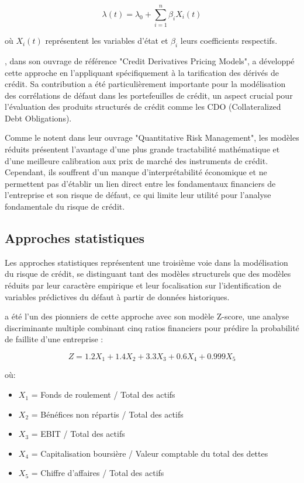 \begin{equation}
\lambda(t) = \lambda_0 + \sum_{i=1}^n \beta_i X_i(t)
\end{equation}

où $X_i(t)$ représentent les variables d'état et $\beta_i$ leurs coefficients respectifs.

\citet{schonbucher2003}, dans son ouvrage de référence "Credit Derivatives Pricing Models", a développé cette approche en l'appliquant spécifiquement à la tarification des dérivés de crédit. Sa contribution a été particulièrement importante pour la modélisation des corrélations de défaut dans les portefeuilles de crédit, un aspect crucial pour l'évaluation des produits structurés de crédit comme les CDO (Collateralized Debt Obligations).

Comme le notent \citet{mcneil2015} dans leur ouvrage "Quantitative Risk Management", les modèles réduits présentent l'avantage d'une plus grande tractabilité mathématique et d'une meilleure calibration aux prix de marché des instruments de crédit. Cependant, ils souffrent d'un manque d'interprétabilité économique et ne permettent pas d'établir un lien direct entre les fondamentaux financiers de l'entreprise et son risque de défaut, ce qui limite leur utilité pour l'analyse fondamentale du risque de crédit.

\subsection{Approches statistiques}

Les approches statistiques représentent une troisième voie dans la modélisation du risque de crédit, se distinguant tant des modèles structurels que des modèles réduits par leur caractère empirique et leur focalisation sur l'identification de variables prédictives du défaut à partir de données historiques.

\citet{altman1968} a été l'un des pionniers de cette approche avec son modèle Z-score, une analyse discriminante multiple combinant cinq ratios financiers pour prédire la probabilité de faillite d'une entreprise :

\begin{equation}
Z = 1.2X_1 + 1.4X_2 + 3.3X_3 + 0.6X_4 + 0.999X_5
\end{equation}

où:
\begin{itemize}
    \item $X_1$ = Fonds de roulement / Total des actifs
    \item $X_2$ = Bénéfices non répartis / Total des actifs
    \item $X_3$ = EBIT / Total des actifs
    \item $X_4$ = Capitalisation boursière / Valeur comptable du total des dettes
    \item $X_5$ = Chiffre d'affaires / Total des actifs
\end{itemize}


